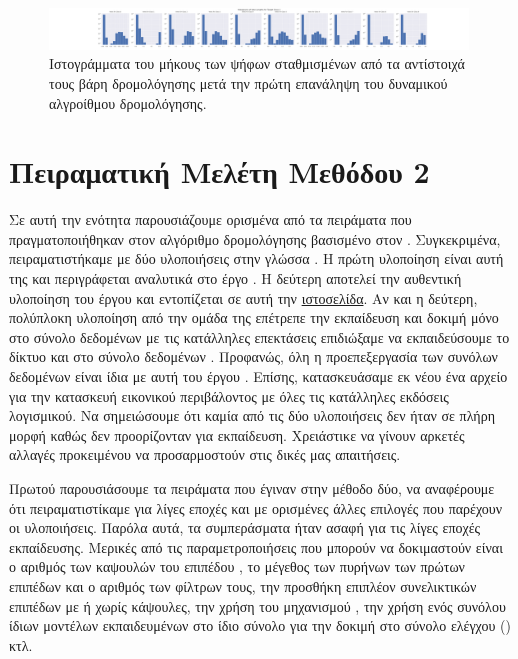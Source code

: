  \begin{figure}[h]
    \centering
    \includegraphics[trim={14cm 0 13cm 0},clip, width=0.99\textwidth]{images/chapter experiments/method 1/image 14/hists_for_class_1_r_1.png}
    \caption{Ιστογράμματα του μήκους των ψήφων σταθμισμένων από τα αντίστοιχά τους βάρη δρομολόγησης μετά την πρώτη επανάληψη του δυναμικού αλγροίθμου δρομολόγησης.}
    \label{fig:exp_method_1_special_hist_r_1}
  \end{figure}


\section{Πειραματική Μελέτη Μεθόδου 2}
Σε αυτή την ενότητα παρουσιάζουμε ορισμένα από τα πειράματα που πραγματοποιήθηκαν στον αλγόριθμο δρομολόγησης βασισμένο στον . Συγκεκριμένα, πειραματιστήκαμε με δύο υλοποιήσεις στην γλώσσα . Η πρώτη υλοποίηση είναι αυτή της  και περιγράφεται αναλυτικά στο έργο \cite{gritzman2019avoiding}. Η δεύτερη αποτελεί την αυθεντική υλοποίηση του έργου \cite{hinton2018matrix} και εντοπίζεται σε αυτή την \href{https://git.informatik.uni-hamburg.de/0moin/google-research/-/commits/master/capsule_em}{ιστοσελίδα}. Αν και η δεύτερη, πολύπλοκη υλοποίηση από την ομάδα της  επέτρεπε την εκπαίδευση και δοκιμή μόνο στο σύνολο δεδομένων  με τις κατάλληλες επεκτάσεις επιδιώξαμε να εκπαιδεύσουμε το δίκτυο και στο σύνολο δεδομένων . Προφανώς, όλη η προεπεξεργασία των συνόλων δεδομένων είναι ίδια με αυτή του έργου \cite{hinton2018matrix}. Επίσης, κατασκευάσαμε εκ νέου ένα αρχείο  για την κατασκευή εικονικού περιβάλοντος με όλες τις κατάλληλες εκδόσεις λογισμικού. Να σημειώσουμε ότι καμία από τις δύο υλοποιήσεις δεν ήταν σε πλήρη μορφή καθώς δεν προορίζονταν για εκπαίδευση. Χρειάστικε να γίνουν αρκετές αλλαγές προκειμένου να προσαρμοστούν στις δικές μας απαιτήσεις.\par

Πρωτού παρουσιάσουμε τα πειράματα που έγιναν στην μέθοδο δύο, να αναφέρουμε ότι πειραματιστίκαμε για λίγες εποχές και με ορισμένες άλλες επιλογές που παρέχουν οι υλοποιήσεις. Παρόλα αυτά, τα συμπεράσματα ήταν ασαφή για τις λίγες εποχές εκπαίδευσης. Μερικές από τις παραμετροποιήσεις που μπορούν να δοκιμαστούν είναι ο αριθμός των καψουλών του επιπέδου , το μέγεθος των πυρήνων των πρώτων επιπέδων και ο αριθμός των φίλτρων τους, την προσθήκη επιπλέον συνελικτικών επιπέδων με ή χωρίς κάψουλες, την χρήση του μηχανισμού , την χρήση ενός συνόλου ίδιων μοντέλων εκπαιδευμένων στο ίδιο σύνολο για την δοκιμή στο σύνολο ελέγχου () κτλ.\par

